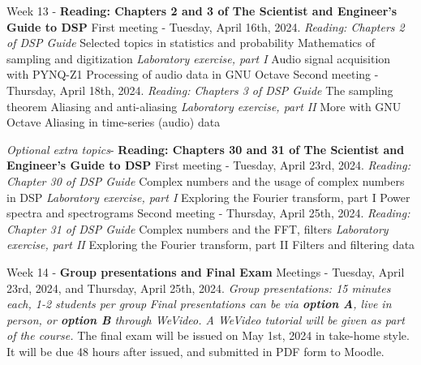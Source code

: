 \documentclass[10pt]{article}
\begin{document}
\begin{outline}[enumerate]
\1 Week 13 - \textbf{Reading: Chapters 2 and 3 of The Scientist and Engineer's Guide to DSP}
\2 First meeting - Tuesday, April 16th, 2024. \textit{Reading: Chapters 2 of DSP Guide}
\3 Selected topics in statistics and probability
\3 Mathematics of sampling and digitization
\3 \textit{Laboratory exercise, part I}
\4 Audio signal acquisition with PYNQ-Z1
\4 Processing of audio data in GNU Octave
\2 Second meeting - Thursday, April 18th, 2024. \textit{Reading: Chapters 3 of DSP Guide}
\3 The sampling theorem
\3 Aliasing and anti-aliasing
\3 \textit{Laboratory exercise, part II}
\4 More with GNU Octave
\4 Aliasing in time-series (audio) data

\1 \textit{Optional extra topics}- \textbf{Reading: Chapters 30 and 31 of The Scientist and Engineer's Guide to DSP}
\2 First meeting - Tuesday, April 23rd, 2024. \textit{Reading: Chapter 30 of DSP Guide}
\3 Complex numbers and the usage of complex numbers in DSP
\3 \textit{Laboratory exercise, part I}
\4 Exploring the Fourier transform, part I
\4 Power spectra and spectrograms
\2 Second meeting - Thursday, April 25th, 2024. \textit{Reading: Chapter 31 of DSP Guide}
\3 Complex numbers and the FFT, filters
\3 \textit{Laboratory exercise, part II}
\4 Exploring the Fourier transform, part II
\4 Filters and filtering data

\1 Week 14 - \textbf{Group presentations and Final Exam}
\2 Meetings - Tuesday, April 23rd, 2024, and Thursday, April 25th, 2024.
\3 \textit{Group presentations: 15 minutes each, 1-2 students per group}
\3 \textit{Final presentations can be via \textbf{option A}, live in person, or \textbf{option B} through WeVideo. A WeVideo tutorial will be given as part of the course.}
\2 The final exam will be issued on May 1st, 2024 in take-home style.  It will be due 48 hours after issued, and submitted in PDF form to Moodle.
\end{outline}
\end{document}
